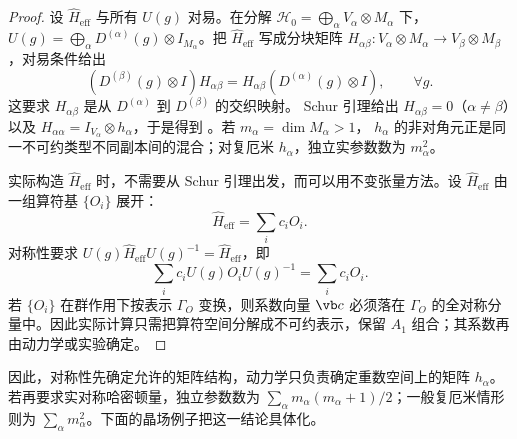 \begin{proof}
设 $\hat H_{\mathrm{eff}}$ 与所有 $U(g)$ 对易。在分解 $\mathcal H_0=\bigoplus_\alpha V_\alpha\otimes M_\alpha$ 下，$U(g)=\bigoplus_\alpha D^{(\alpha)}(g)\otimes I_{M_\alpha}$。把 $\hat H_{\mathrm{eff}}$ 写成分块矩阵 $H_{\alpha\beta}:V_\alpha\otimes M_\alpha\to V_\beta\otimes M_\beta$，对易条件给出
\[
(D^{(\beta)}(g)\otimes I)H_{\alpha\beta}=H_{\alpha\beta}(D^{(\alpha)}(g)\otimes I),\qquad\forall g.
\]
这要求 $H_{\alpha\beta}$ 是从 $D^{(\alpha)}$ 到 $D^{(\beta)}$ 的交织映射。
Schur 引理给出 $H_{\alpha\beta}=0$（$\alpha\ne\beta$）以及
$H_{\alpha\alpha}=I_{V_\alpha}\otimes h_\alpha$，于是得到
。若 $m_\alpha=\dim M_\alpha>1$，
$h_\alpha$ 的非对角元正是同一不可约类型不同副本间的混合；对复厄米
$h_\alpha$，独立实参数数为 $m_\alpha^2$。

实际构造 $\hat H_{\mathrm{eff}}$ 时，不需要从 Schur 引理出发，而可以用不变张量方法。设 $\hat H_{\mathrm{eff}}$ 由一组算符基 $\{O_i\}$ 展开：
\[
\hat H_{\mathrm{eff}}=\sum_i c_i O_i.
\]
对称性要求 $U(g)\hat H_{\mathrm{eff}}U(g)^{-1}=\hat H_{\mathrm{eff}}$，即
\[
\sum_i c_i U(g)O_iU(g)^{-1}=\sum_i c_i O_i.
\]
若 $\{O_i\}$ 在群作用下按表示 $\Gamma_O$ 变换，则系数向量 $\vb c$ 必须落在
$\Gamma_O$ 的全对称分量中。因此实际计算只需把算符空间分解成不可约表示，保留
$A_1$ 组合；其系数再由动力学或实验确定。
\end{proof}


\par\medskip
\par\medskip

因此，对称性先确定允许的矩阵结构，动力学只负责确定重数空间上的矩阵 $h_\alpha$。若再要求实对称哈密顿量，独立参数数为 $\sum_\alpha m_\alpha(m_\alpha+1)/2$；一般复厄米情形则为 $\sum_\alpha m_\alpha^2$。下面的晶场例子把这一结论具体化。


